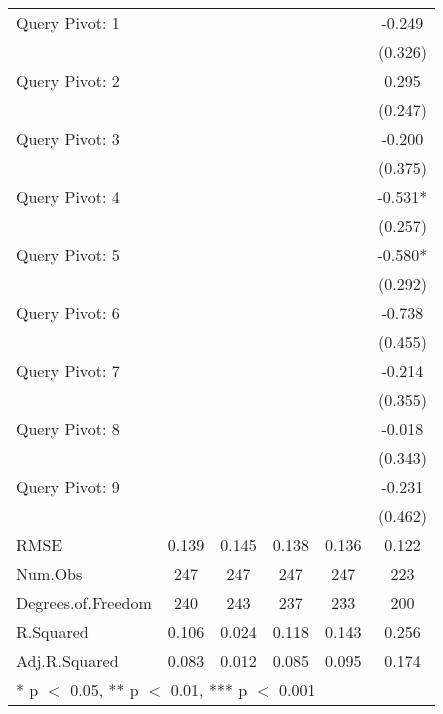 \begin{table}
\begin{tabular}[t]{lccccc}
Query Pivot: 1 &  &  &  &  & -0.249\\
 &  &  &  &  & (0.326)\\
Query Pivot: 2 &  &  &  &  & 0.295\\
 &  &  &  &  & (0.247)\\
Query Pivot: 3 &  &  &  &  & -0.200\\
 &  &  &  &  & (0.375)\\
Query Pivot: 4 &  &  &  &  & -0.531*\\
 &  &  &  &  & (0.257)\\
Query Pivot: 5 &  &  &  &  & -0.580*\\
 &  &  &  &  & (0.292)\\
Query Pivot: 6 &  &  &  &  & -0.738\\
 &  &  &  &  & (0.455)\\
Query Pivot: 7 &  &  &  &  & -0.214\\
 &  &  &  &  & (0.355)\\
Query Pivot: 8 &  &  &  &  & -0.018\\
 &  &  &  &  & (0.343)\\
Query Pivot: 9 &  &  &  &  & -0.231\\
 &  &  &  &  & (0.462)\\
\midrule
RMSE & 0.139 & 0.145 & 0.138 & 0.136 & 0.122\\
Num.Obs & 247 & 247 & 247 & 247 & 223\\
Degrees.of.Freedom & 240 & 243 & 237 & 233 & 200\\
R.Squared & 0.106 & 0.024 & 0.118 & 0.143 & 0.256\\
Adj.R.Squared & 0.083 & 0.012 & 0.085 & 0.095 & 0.174\\
\bottomrule
\multicolumn{6}{l}{\rule{0pt}{1em}* p $<$ 0.05, ** p $<$ 0.01, *** p $<$ 0.001}\\
\end{tabular}
\end{table}
